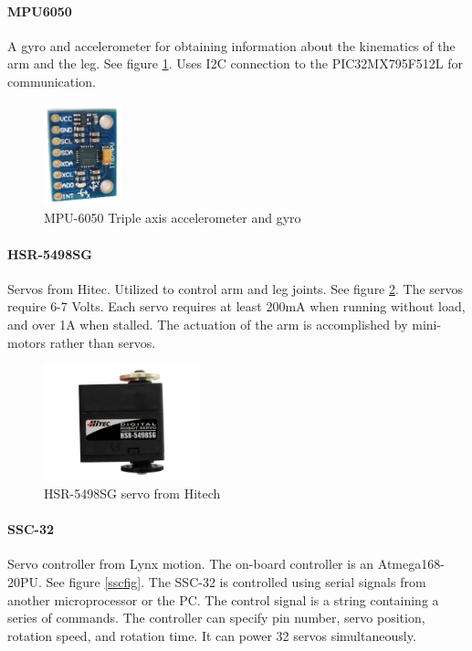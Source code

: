 \documentclass[titlepage,letterpaper,12pt]{article}
\begin{document}
\paragraph{MPU6050}A gyro and accelerometer for obtaining information about the
kinematics of the arm and the leg. See figure \ref{mpufig}. Uses I2C connection
to the PIC32MX795F512L for communication\cite{mpu6050data}.

\begin{figure}
  \centering
    \includegraphics[width=0.2\textwidth]{figures/mpu-6050.jpg}
  \caption{MPU-6050 Triple axis accelerometer and gyro\protect\cite{Krodal2013}}
  \label{mpufig}
\end{figure}

\paragraph{HSR-5498SG}Servos from Hitec. Utilized to control arm and leg
joints. See figure \ref{hsrfig}. The servos require 6-7 Volts. Each servo
requires at least 200mA when running without load, and over 1A when stalled.
The actuation of the arm is accomplished by mini-motors rather than
servos\cite{sscdata}.

\begin{figure}
  \centering
    \includegraphics[width=0.4\textwidth]{figures/191_1_HSR-5498SG_HMI_Premium_Robot_Servo-1.jpg}
  \caption{HSR-5498SG servo from Hitech\protect\cite{hsrfigcite}}
  \label{hsrfig}
\end{figure}

\paragraph{SSC-32}Servo controller from Lynx motion. The on-board controller is
an Atmega168-20PU. See figure \ref{sscfig}. The SSC-32 is controlled using
serial signals from another microprocessor or the PC. The control signal is a
string containing a series of commands. The controller can specify pin number,
servo position, rotation speed, and rotation time. It can power 32 servos
simultaneously\cite{servodata}.
\end{document}
